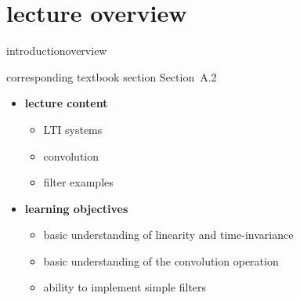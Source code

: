 


\subtitle{Module A.2: Fundamentals~---~Convolution}


	

    \section[overview]{lecture overview}
        \begin{frame}{introduction}{overview}
            \begin{block}{corresponding textbook section}
                    Section~A.2
            \end{block}

            \begin{itemize}
                \item   \textbf{lecture content}
                    \begin{itemize}
                        \item   LTI systems
                        \item   convolution
                        \item   filter examples
                    \end{itemize}
                \bigskip
                \item<2->   \textbf{learning objectives}
                    \begin{itemize}
                        \item   basic understanding of linearity and time-invariance
                        \item   basic understanding of the convolution operation
                        \item   ability to implement simple filters
                    \end{itemize}
            \end{itemize}
        \end{frame}
        
